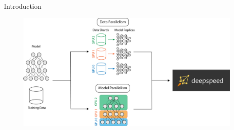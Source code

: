 \begin{frame}{Introduction}
    \begin{center}
        \begin{figure}[H]
            \includegraphics[scale=.35]{figures/introduction/dp-mp-deepspeed.png}
        \end{figure}
    \end{center}
\end{frame}

